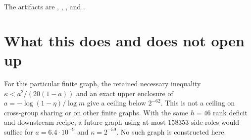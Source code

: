 \documentclass[11pt]{article}
\begin{document}
The artifacts are ,
,
, and
.

\section{What this does and does not open up}
For this particular finite graph, the retained necessary inequality
$\kappa<a^2/(20(1-a))$ and an exact upper enclosure of
$a=-\log(1-\eta)/\log m$ give a ceiling below $2^{-62}$.
This is not a ceiling on cross-group sharing or on other finite graphs.
With the same $h=46$ rank deficit and downstream recipe, a future graph using
at most 158353 side roles would suffice for $a=6.4\cdot10^{-9}$ and
$\kappa=2^{-59}$. No such graph is constructed here.
\end{document}
